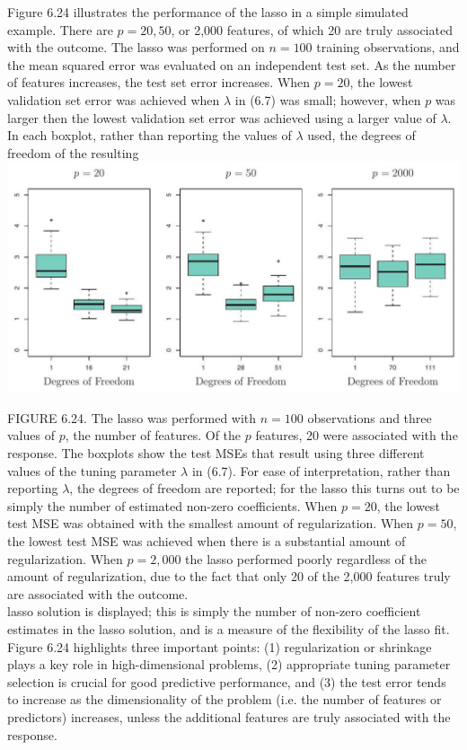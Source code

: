 \documentclass[10pt]{article}
\begin{document}
Figure 6.24 illustrates the performance of the lasso in a simple simulated example. There are $p=20,50$, or 2,000 features, of which 20 are truly associated with the outcome. The lasso was performed on $n=100$ training observations, and the mean squared error was evaluated on an independent test set. As the number of features increases, the test set error increases. When $p=20$, the lowest validation set error was achieved when $\lambda$ in (6.7) was small; however, when $p$ was larger then the lowest validation set error was achieved using a larger value of $\lambda$. In each boxplot, rather than reporting the values of $\lambda$ used, the degrees of freedom of the resulting\\
\includegraphics[max width=\textwidth, center]{2025_05_05_efe77898333945044de4g-257}

FIGURE 6.24. The lasso was performed with $n=100$ observations and three values of $p$, the number of features. Of the $p$ features, 20 were associated with the response. The boxplots show the test MSEs that result using three different values of the tuning parameter $\lambda$ in (6.7). For ease of interpretation, rather than reporting $\lambda$, the degrees of freedom are reported; for the lasso this turns out to be simply the number of estimated non-zero coefficients. When $p=20$, the lowest test MSE was obtained with the smallest amount of regularization. When $p=50$, the lowest test MSE was achieved when there is a substantial amount of regularization. When $p=2,000$ the lasso performed poorly regardless of the amount of regularization, due to the fact that only 20 of the 2,000 features truly are associated with the outcome.\\
lasso solution is displayed; this is simply the number of non-zero coefficient estimates in the lasso solution, and is a measure of the flexibility of the lasso fit. Figure 6.24 highlights three important points: (1) regularization or shrinkage plays a key role in high-dimensional problems, (2) appropriate tuning parameter selection is crucial for good predictive performance, and (3) the test error tends to increase as the dimensionality of the problem (i.e. the number of features or predictors) increases, unless the additional features are truly associated with the response.
\end{document}
